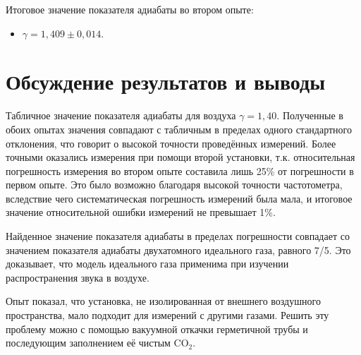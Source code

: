 \documentclass[a4paper,12pt]{article} %
\begin{document}
Итоговое значение показателя адиабаты во втором опыте:

\begin{itemize}
    \item $\gamma = 1,409 \pm 0,014$. 
\end{itemize}

\section{Обсуждение результатов и выводы}

Табличное значение показателя адиабаты для воздуха $\gamma = 1,40$. Полученные в обоих опытах значения совпадают с табличным в пределах одного стандартного отклонения, что говорит о высокой точности проведённых измерений. Более точными оказались измерения при помощи второй установки, т.к. относительная погрешность измерения во втором опыте составила лишь 25\% от погрешности в первом опыте. Это было возможно благодаря высокой точности частотометра, вследствие чего систематическая погрешность измерений была мала, и итоговое значение относительной ошибки измерений не превышает 1\%.

Найденное значение показателя адиабаты в пределах погрешности совпадает со значением показателя адиабаты двухатомного идеального газа, равного 7/5. Это доказывает, что модель идеального газа применима при изучении распространения звука в воздухе.

Опыт показал, что установка, не изолированная от внешнего воздушного пространства, мало подходит для измерений с другими газами. Решить эту проблему можно с помощью вакуумной откачки герметичной трубы и последующим заполнением её чистым CO$_2$.
\end{document}
